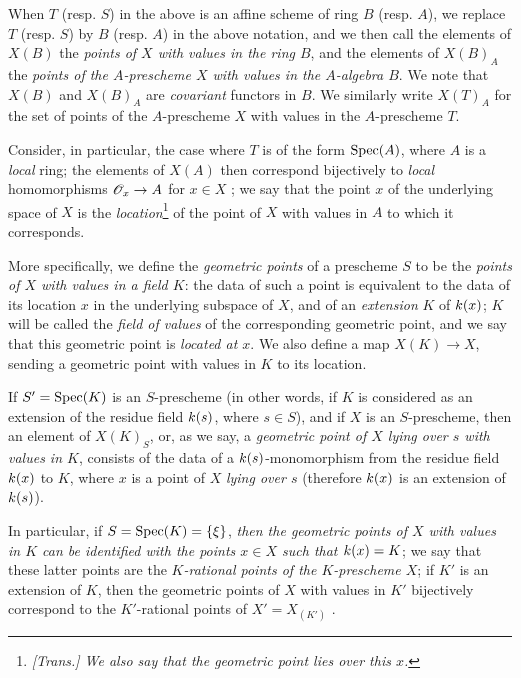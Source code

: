 \begin{env}[3.4.4]
\label{I.3.4.4}
When $T$ (resp. $S$) in the above is an affine scheme of ring $B$ (resp. $A$), we replace
$T$ (resp. $S$) by $B$ (resp. $A$) in the above notation, and we then call the elements of
$X(B)$ the \emph{points of $X$ with values in the ring $B$}, and the elements of $X(B)_A$ the
\emph{points of the $A$-prescheme $X$ with values in the $A$-algebra $B$}. We note that
$X(B)$ and $X(B)_A$ are \emph{covariant} functors in $B$. We similarly write $X(T)_A$ for the
set of points of the $A$-prescheme $X$ with values in the $A$-prescheme $T$.
\end{env}

\begin{env}[3.4.5]
\label{I.3.4.5}
Consider, in particular, the case where $T$ is of the form $\operatorname{Spec}(A)$, where $A$ is a
\emph{local} ring; the elements of $X(A)$ then correspond bijectively to \emph{local}
homomorphisms $\sh{O}_x\to A$ for $x\in X$ ; we say that the
point $x$ of the underlying space of $X$ is the \emph{location}\footnote{\emph{[Trans.] We also say that
\emph{the geometric point lies over this $x$}.}} of the point of $X$ with values in $A$ to which it corresponds.

More specifically, we define the \emph{geometric points} of a prescheme $S$ to be the \emph{points of
$X$ with values in a field $K$}: the data of such a point is equivalent to the data of its
location $x$ in the underlying subspace of $X$, and of an \emph{extension} $K$ of $k(x)$;
$K$ will be called the \emph{field of values} of the corresponding geometric point, and we
say that this geometric point is \emph{located at $x$}. We also define a map $X(K)\to X$,
sending a geometric point with values in $K$ to its location.

If $S'=\operatorname{Spec}(K)$ is an $S$-prescheme (in other words, if $K$ is considered as an extension
of the residue field $k(s)$, where $s\in S$), and if $X$ is an $S$-prescheme, then an
element of $X(K)_S$, or, as we say, a \emph{geometric point of $X$ lying over $s$ with values
in $K$}, consists of the data of a $k(s)$-monomorphism from the residue field $k(x)$
to $K$, where $x$ is a point of $X$ \emph{lying over $s$} (therefore $k(x)$ is an
extension of $k(s)$).

In particular, if $S=\operatorname{Spec}(K)=\{\xi\}$, \emph{then the geometric points of $X$ with values in
$K$ can be identified with the points $x\in X$ such that $k(x)=K$}; we say that these latter
points are the \emph{$K$-rational points of the $K$-prescheme $X$}; if $K'$ is an extension
of $K$, then the geometric points of $X$ with values in $K'$ bijectively correspond to the
$K'$-rational points of $X'=X_{(K')}$ .
\end{env}

